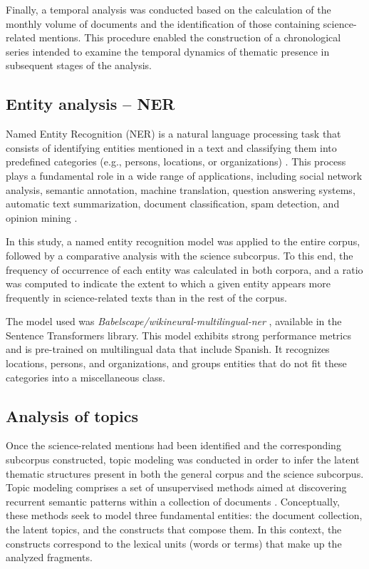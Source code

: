 \documentclass[11pt,a4paper]{article}
\begin{document}
	Finally, a temporal analysis was conducted based on the calculation of the monthly volume of documents and the identification of those containing science-related mentions. This procedure enabled the construction of a chronological series intended to examine the temporal dynamics of thematic presence in subsequent stages of the analysis.
	
	
	
	\subsection{Entity analysis – NER}
	
	
	Named Entity Recognition (NER) is a natural language processing task that consists of identifying entities mentioned in a text and classifying them into predefined categories (e.g., persons, locations, or organizations) \cite{Jehangir2023}. This process plays a fundamental role in a wide range of applications, including social network analysis, semantic annotation, machine translation, question answering systems, automatic text summarization, document classification, spam detection, and opinion mining \cite{Jehangir2023}.
	
	In this study, a named entity recognition model was applied to the entire corpus, followed by a comparative analysis with the science subcorpus. To this end, the frequency of occurrence of each entity was calculated in both corpora, and a ratio was computed to indicate the extent to which a given entity appears more frequently in science-related texts than in the rest of the corpus.
	
	The model used was\textit{ Babelscape/wikineural-multilingual-ner} \cite{tedeschi-etal-2021-wikineural-combined}, available in the Sentence Transformers library. This model exhibits strong performance metrics and is pre-trained on multilingual data that include Spanish. It recognizes locations, persons, and organizations, and groups entities that do not fit these categories into a miscellaneous class.
	
	
	
	\subsection{Analysis of topics}\label{sec:topic_model}
	
	
	Once the science-related mentions had been identified and the corresponding subcorpus constructed, topic modeling was conducted in order to infer the latent thematic structures present in both the general corpus and the science subcorpus. Topic modeling comprises a set of unsupervised methods aimed at discovering recurrent semantic patterns within a collection of documents \cite{Abdelrazek2023}. Conceptually, these methods seek to model three fundamental entities: the document collection, the latent topics, and the constructs that compose them. In this context, the constructs correspond to the lexical units (words or terms) that make up the analyzed fragments.
\end{document}
